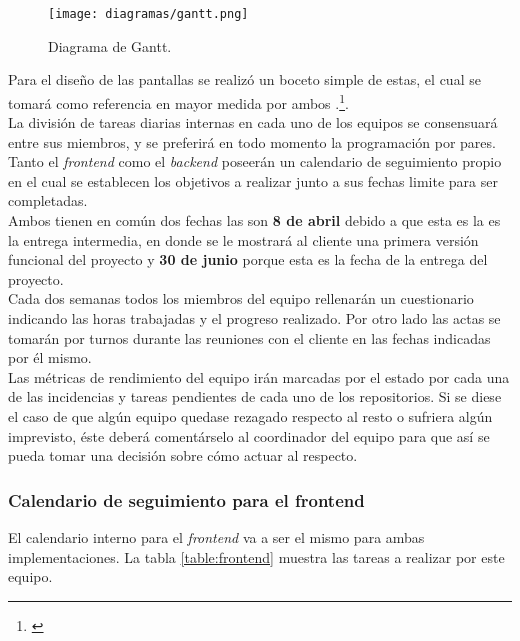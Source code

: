 \documentclass[11pt, a4paper, titlepage]{article}
\begin{document}
\begin{landscape}
    \pagestyle{empty}
    \begin{figure}[!p]
    \centering

    \texttt{[image: diagramas/gantt.png]}
    \caption{Diagrama de Gantt.}
    \label{fig:gantt}
\end{figure}
\end{landscape}

 Para el diseño de las pantallas se realizó un boceto simple de estas, el cual se tomará como referencia en mayor medida por ambos .\footnote{\href{https://github.com/UNIZAR-30226-2022-01/proyecto_software_documentacion/tree/main/imagenes}{}}.
\\

La división de tareas diarias internas en cada uno de los equipos se consensuará entre sus miembros, y se preferirá en todo momento la programación por pares.\\

Tanto el \textit{frontend} como el \textit{backend} poseerán un calendario de seguimiento propio en el cual se establecen los objetivos a realizar junto a sus fechas limite para ser completadas. \\

Ambos tienen en común dos fechas las son \textbf{8 de abril} debido a que esta es la es la entrega intermedia, en donde se le mostrará al cliente una primera versión funcional del proyecto
y \textbf{30 de junio} porque esta es la fecha de la entrega del proyecto.\\

Cada dos semanas todos los miembros del equipo rellenarán un cuestionario indicando las horas trabajadas y el progreso realizado. Por otro lado las actas se tomarán por turnos durante las reuniones con el cliente en las fechas indicadas por él mismo.\\

Las métricas de rendimiento del equipo irán marcadas por el estado por cada una de las incidencias y tareas pendientes de cada uno de los repositorios. Si se diese el caso de que algún equipo quedase rezagado respecto al resto o sufriera algún imprevisto, éste deberá comentárselo al coordinador del equipo para que así se pueda tomar una decisión sobre cómo actuar al respecto.

\subsubsection{Calendario de seguimiento para el frontend}
El calendario interno para el \textit{frontend} va a ser el mismo para ambas implementaciones. La tabla \ref{table:frontend} muestra las tareas a realizar por este equipo. \newline
\end{document}
